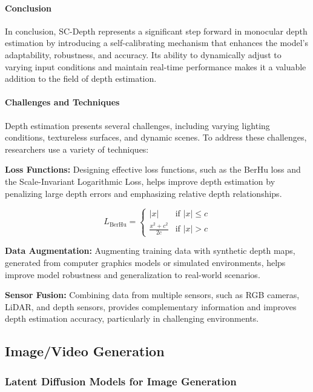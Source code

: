 \documentclass[12pt]{article}
\begin{document}
\paragraph{Conclusion}

In conclusion, SC-Depth represents a significant step forward in monocular depth estimation by introducing a self-calibrating mechanism that enhances the model's adaptability, robustness, and accuracy. Its ability to dynamically adjust to varying input conditions and maintain real-time performance makes it a valuable addition to the field of depth estimation.

\paragraph{Challenges and Techniques}

Depth estimation presents several challenges, including varying lighting conditions, textureless surfaces, and dynamic scenes. To address these challenges, researchers use a variety of techniques:

\textbf{Loss Functions:} Designing effective loss functions, such as the BerHu loss and the Scale-Invariant Logarithmic Loss, helps improve depth estimation by penalizing large depth errors and emphasizing relative depth relationships.

\[
L_{\text{BerHu}} = \begin{cases} 
|x| & \text{if } |x| \leq c \\
\frac{x^2 + c^2}{2c} & \text{if } |x| > c 
\end{cases}
\]

\textbf{Data Augmentation:} Augmenting training data with synthetic depth maps, generated from computer graphics models or simulated environments, helps improve model robustness and generalization to real-world scenarios.

\textbf{Sensor Fusion:} Combining data from multiple sensors, such as RGB cameras, LiDAR, and depth sensors, provides complementary information and improves depth estimation accuracy, particularly in challenging environments.

\subsection{Image/Video Generation}

\subsubsection{Latent Diffusion Models for Image Generation}
\end{document}
